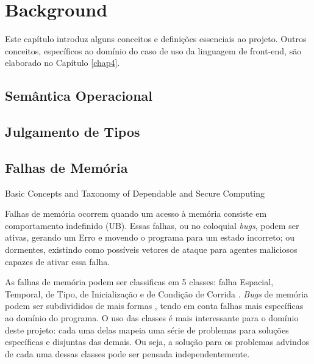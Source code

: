 \chapter{Background}

Este capítulo introduz alguns conceitos e definições essenciais ao projeto. 
Outros conceitos, específicos ao domínio do caso de uso da linguagem de front-end,
são elaborado no Capítulo \ref{chap4}. 

\section{Semântica Operacional}

\section{Julgamento de Tipos}

\section{Falhas de Memória}
\label{sec:mem-error}


Basic Concepts and Taxonomy of Dependable and Secure Computing

Falhas de memória ocorrem quando um acesso à memória consiste em comportamento
indefinido (UB). Essas falhas, ou no coloquial \emph{bugs}, podem ser ativas, 
gerando um Erro e movendo o programa para um estado incorreto; ou dormentes, 
existindo como possíveis vetores de ataque para agentes maliciosos capazes de 
ativar essa falha. 

As falhas de memória podem ser classificas em 5 classes: falha Espacial, 
Temporal, de Tipo, de Inicialização e de Condição de Corrida \cite{Apple22,Google24}.
\emph{Bugs} de memória podem ser subdivididos de mais formas \cite{7KINGDOMS,CWELIST},
tendo em conta falhas mais específicas ao domínio do programa. 
O uso das classes é mais interessante para o domínio deste projeto:
cada uma delas mapeia uma série de problemas para soluções específicas e disjuntas das demais. 
Ou seja, a solução para os problemas advindos de cada uma dessas classes pode ser 
pensada independentemente. 

